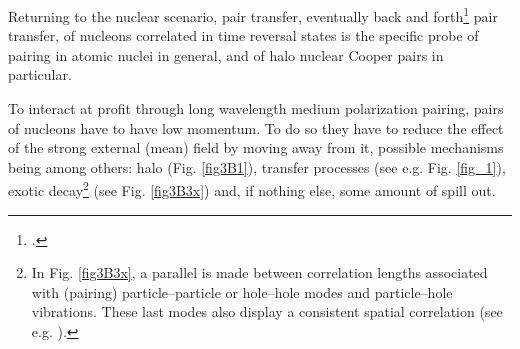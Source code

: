 Returning to the nuclear scenario, pair transfer, eventually back and forth\footnote{\cite{Potel:20b,r}.} pair transfer, of nucleons correlated in time reversal states is the specific probe of pairing in atomic nuclei in general, and of halo nuclear Cooper pairs in particular.

 To interact at profit through long wavelength medium polarization pairing, pairs of nucleons have to have low momentum. To do so they have to reduce the effect of the strong external (mean) field by moving away from it, possible mechanisms being among others: halo (Fig. \ref{fig3B1}), transfer processes (see e.g. Fig. \ref{fig_1}), exotic decay\footnote{In Fig. \ref{fig3B3x}, a parallel is made between correlation lengths associated with (pairing) particle--particle or hole--hole modes and particle--hole vibrations. These last modes  also display a consistent spatial correlation (see e.g. \cite{Broglia:71}).} (see Fig. \ref{fig3B3x}) and, if nothing else, some amount of spill out.
